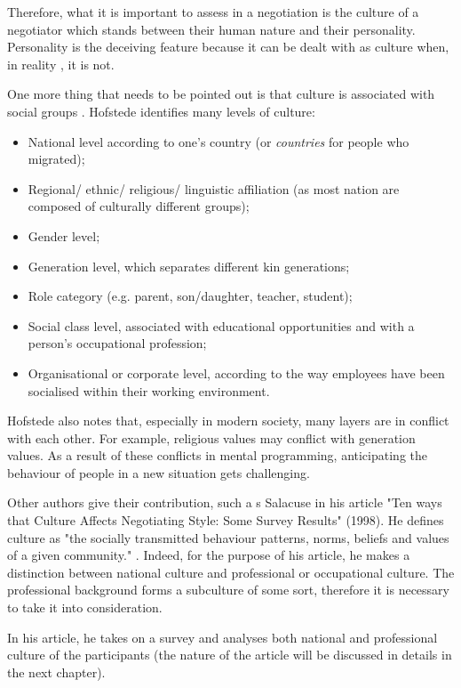 \documentclass[../main.tex]{subfiles}
\begin{document}
Therefore, what it is important to assess in a negotiation is the culture of a negotiator which stands between their human nature and their personality. Personality is the deceiving feature because it can be dealt with as culture when, in reality , it is not.

One more thing that needs to be pointed out is that culture is associated with social groups \autocite[7]{helen}. Hofstede identifies many levels of culture:
\begin{itemize}
\item National level according to one's country (or \textit{countries} for people who migrated);
\item Regional/ ethnic/ religious/ linguistic affiliation (as most nation are composed of culturally different groups);
\item Gender level;
\item Generation level, which separates different kin generations;
\item Role category (e.g. parent, son/daughter, teacher, student);
\item Social class level, associated with educational opportunities and with a person's occupational profession;
\item Organisational or corporate level, according to the way employees have been socialised within their working environment. \autocite[18]{hofstede}
\end{itemize}
Hofstede also notes that, especially in modern society, many layers are in conflict with each other. For example, religious values may conflict with generation values. As a result of these conflicts in mental programming, anticipating the behaviour of people in a new situation gets challenging.

Other authors give their contribution, such a s Salacuse in his article "Ten ways that Culture Affects Negotiating Style: Some Survey Results" (1998). He defines culture as "the socially transmitted behaviour patterns, norms, beliefs and values of a given community." \autocite[222]{salacuse}. Indeed, for the purpose of his article, he makes a distinction between national culture and professional or occupational culture. The professional background forms a subculture of some sort, therefore it is necessary to take it into consideration.

In his article, he takes on a survey and analyses both national and professional culture of the participants (the nature of the article will be discussed in details in the next chapter).
\end{document}
